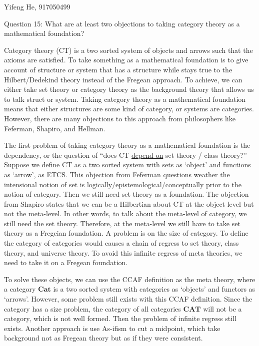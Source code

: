 \documentclass[11pt]{article}
\newcommand{\cat}{%
    \mathbf%
}
\begin{document}
\begin{center}
    Yifeng He, 917050499
\end{center}

\begin{center}
    Question 15:
    What are at least two objections to taking category theory as a mathematical foundation?
\end{center}

Category theory (CT) is a two sorted system of objects and arrows such that the axioms are satisfied.
To take something as a mathematical foundation is to give account of structure or system that has a structure
while stays true to the Hilbert/Dedekind theory instead of the Fregean approach.
To achieve, we can either take set theory or category theory as the background theory 
that allows us to talk struct or system.
Taking category theory as a mathematical foundation means that either structures are some kind of category,
or systems are categories.
However, there are many objections to this approach from philosophers like Feferman, Shapiro, and Hellman.

The first problem of taking category theory as a mathematical foundation is the dependency,
or the question of ``does CT \underline{depend on} set theory / class theory?''
Suppose we define CT as a two sorted system with sets as `object' and functions as `arrow', as ETCS.
This objection from Feferman questions weather the intensional notion of set is logically/epistemological/conceptually prior
to the notion of category.
Then we still need set theory as a foundation.
The objection from Shapiro states that we can be a Hilbertian about CT at the object level but not the meta-level.
In other words, to talk about the meta-level of category, we still need the set theory.
Therefore, at the meta-level we still have to take set theory as a Fregeian foundation.
A problem is on the size of category.
To define the category of categories would causes a chain of regress to set theory, class theory, and universe theory.
To avoid this infinite regress of meta theories, we need to take it on a Fregean foundation.

To solve these objects, we can use the CCAF definition as the meta theory,
where a category $\cat{Cat}$ is a two sorted system with categories as `objects' and functors as `arrows'.
However, some problem still exists with this CCAF definition.
Since the category has a size problem, the category of all categories $\cat{CAT}$ will not be a category,
which is not well formed.
Then the problem of infinite regress still exists.
Another approach is use As-ifism to cut a midpoint,
which take background not as Fregean theory but as if they were consistent.
\end{document}
